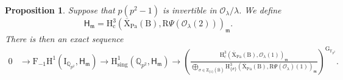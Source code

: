 \documentclass[10pt]{amsart}
\numberwithin{equation}{section}
\newtheorem{proposition}[equation]{Proposition}
\theoremstyle{definition}
\def\Pa{\mathrm{Pa}}
\def\calO{\mathcal{O}}
\def\fracm{\mathfrak{m}}
\def\FF{\mathbb{F}}
\def\QQ{\mathbb{Q}}
\def\rmB{\mathrm{B}}
\def\rmG{\mathrm{G}}
\def\rmH{\mathrm{H}}
\def\rmR{\mathrm{R}}
\def\rmX{\mathrm{X}}
\def\rmZ{\mathrm{Z}}
\begin{document}
\begin{proposition}\label{mondromy-exact-seq}
Suppose that $p(p^{2}-1)$ is invertible in $\calO_{\lambda}/\lambda$. We define 
\begin{equation*}
\mathsf{H}_{\fracm}=\rmH^{3}_{\mathrm{c}}(\overline{\rmX}_{\Pa}(\rmB), \rmR\Psi(\calO_{\lambda}(2)))_{\fracm}. 
\end{equation*}
There is then an exact sequence 
\begin{equation*}
\begin{aligned}
0&\rightarrow \mathrm{F}_{-1}\mathrm{H}^{1}(\mathrm{I}_{\QQ_{p^{2}}}, \mathsf{H}_{\fracm}) \rightarrow \rmH^{1}_{\mathrm{sing}}(\QQ_{p^{2}}, \mathsf{H}_{\fracm}) \rightarrow (\frac{\rmH^{3}_{\mathrm{c}}(\overline{\rmX}_{\Pa}(\rmB), \calO_{\lambda}(1))_{\fracm}}{\bigoplus\limits_{\sigma\in \rmZ_{\{1\}}(\overline{\rmB})}\rmH^{3}_{\{\sigma\}}(\overline{\rmX}_{\Pa}(\rmB), \rmR\Psi(\calO_{\lambda})(1))_{\fracm}})^{\rmG_{\FF_{p^{2}}}}.\\
\end{aligned}
\end{equation*}
\end{proposition}
\end{document}
